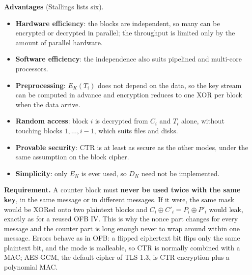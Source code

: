 \begin{center}
\end{center}

\textbf{Advantages} (Stallings lists six).
\begin{itemize}
  \item \textbf{Hardware efficiency}: the blocks are independent, so many can be encrypted or decrypted in parallel; the throughput is limited only by the amount of parallel hardware.
  \item \textbf{Software efficiency}: the independence also suits pipelined and multi-core processors.
  \item \textbf{Preprocessing}: $E_K(T_i)$ does not depend on the data, so the key stream can be computed in advance and encryption reduces to one XOR per block when the data arrive.
  \item \textbf{Random access}: block $i$ is decrypted from $C_i$ and $T_i$ alone, without touching blocks $1, \dots, i-1$, which suits files and disks.
  \item \textbf{Provable security}: CTR is at least as secure as the other modes, under the same assumption on the block cipher.
  \item \textbf{Simplicity}: only $E_K$ is ever used, so $D_K$ need not be implemented.
\end{itemize}

\textbf{Requirement.} A counter block must \textbf{never be used twice with the same key}, in the same message or in different messages. If it were, the same mask would be XORed onto two plaintext blocks and $C_i \oplus C'_i = P_i \oplus P'_i$ would leak, exactly as for a reused OFB IV. This is why the nonce part changes for every message and the counter part is long enough never to wrap around within one message. Errors behave as in OFB: a flipped ciphertext bit flips only the same plaintext bit, and the mode is malleable, so CTR is normally combined with a MAC; AES-GCM, the default cipher of TLS 1.3, is CTR encryption plus a polynomial MAC.

